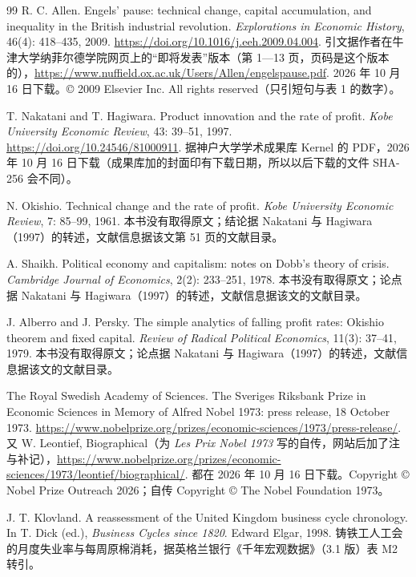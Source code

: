 \begin{thebibliography}{99}
 R. C. Allen. Engels' pause: technical change, capital accumulation, and inequality in the British industrial revolution. \emph{Explorations in Economic History}, 46(4): 418--435, 2009. \url{https://doi.org/10.1016/j.eeh.2009.04.004}. 引文据作者在牛津大学纳菲尔德学院网页上的“即将发表”版本（第 1—13 页，页码是这个版本的），\url{https://www.nuffield.ox.ac.uk/Users/Allen/engelspause.pdf}. 2026 年 10 月 16 日下载。© 2009 Elsevier Inc. All rights reserved（只引短句与表 1 的数字）。

 T. Nakatani and T. Hagiwara. Product innovation and the rate of profit. \emph{Kobe University Economic Review}, 43: 39--51, 1997. \url{https://doi.org/10.24546/81000911}. 据神户大学学术成果库 Kernel 的 PDF，2026 年 10 月 16 日下载（成果库加的封面印有下载日期，所以以后下载的文件 SHA-256 会不同）。

 N. Okishio. Technical change and the rate of profit. \emph{Kobe University Economic Review}, 7: 85--99, 1961. 本书没有取得原文；结论据 Nakatani 与 Hagiwara（1997）的转述，文献信息据该文第 51 页的文献目录。

 A. Shaikh. Political economy and capitalism: notes on Dobb's theory of crisis. \emph{Cambridge Journal of Economics}, 2(2): 233--251, 1978. 本书没有取得原文；论点据 Nakatani 与 Hagiwara（1997）的转述，文献信息据该文的文献目录。

 J. Alberro and J. Persky. The simple analytics of falling profit rates: Okishio theorem and fixed capital. \emph{Review of Radical Political Economics}, 11(3): 37--41, 1979. 本书没有取得原文；论点据 Nakatani 与 Hagiwara（1997）的转述，文献信息据该文的文献目录。

 The Royal Swedish Academy of Sciences. The Sveriges Riksbank Prize in Economic Sciences in Memory of Alfred Nobel 1973: press release, 18 October 1973. \url{https://www.nobelprize.org/prizes/economic-sciences/1973/press-release/}. 又 W. Leontief, Biographical（为 \emph{Les Prix Nobel 1973} 写的自传，网站后加了注与补记），\url{https://www.nobelprize.org/prizes/economic-sciences/1973/leontief/biographical/}. 都在 2026 年 10 月 16 日下载。Copyright © Nobel Prize Outreach 2026；自传 Copyright © The Nobel Foundation 1973。

 J. T. Klovland. A reassessment of the United Kingdom business cycle chronology. In T. Dick (ed.), \emph{Business Cycles since 1820}. Edward Elgar, 1998. 铸铁工人工会的月度失业率与每周原棉消耗，据英格兰银行《千年宏观数据》（3.1 版）表 M2 转引。


\end{thebibliography}
